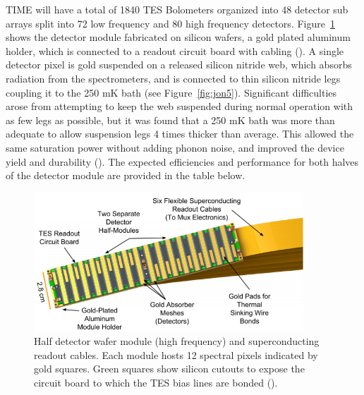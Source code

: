 \documentclass[manuscript]{aastex}
\begin{document}
TIME will have a total of 1840 TES Bolometers organized into 48 detector sub arrays split into 72 low frequency and 80 high frequency detectors. Figure~\ref{fig:jon4} shows the detector module fabricated on silicon wafers, a gold plated aluminum holder, which is connected to a readout circuit board with cabling (\cite{Hunacek2016}). A single detector pixel is gold suspended on a released silicon nitride web, which absorbs radiation from the spectrometers, and is connected to thin silicon nitride legs coupling it to the 250 mK bath (see Figure~\ref{fig:jon5}). Significant difficulties arose from attempting to keep the web suspended during normal operation with as few legs as possible, but it was found that a 250 mK bath was more than adequate to allow suspension legs 4 times thicker than average. This allowed the same saturation power without adding phonon noise, and improved the device yield and durability (\cite{Hunacek2016b}). The expected efficiencies and performance for both halves of the detector module are provided in the table below.

\begin{figure}[H]
\centering
\captionsetup{width=0.9\textwidth}
\includegraphics[width=0.9\textwidth]{jon4.PNG}
\caption[Diagram of a Half Detector Module -(\cite{Hunacek2016b})]{Half detector wafer module (high frequency) and superconducting readout cables. Each module hosts 12 spectral pixels indicated by gold squares. Green squares show silicon cutouts to expose the circuit board to which the TES bias lines are bonded (\cite{Hunacek2016b}).}
\label{fig:jon4}
\end{figure}
\end{document}
